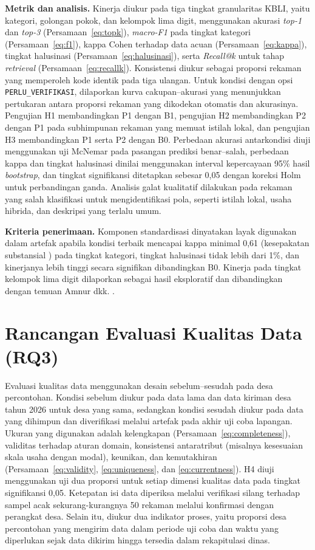 \documentclass[12pt,a4paper]{report}
\begin{document}
\textbf{Metrik dan analisis.} Kinerja diukur pada tiga tingkat granularitas KBLI, yaitu kategori, golongan pokok, dan kelompok lima digit, menggunakan akurasi \textit{top-1} dan \textit{top-3} (Persamaan~\ref{eq:topk}), \textit{macro-F1} pada tingkat kategori (Persamaan~\ref{eq:f1}), kappa Cohen terhadap data acuan (Persamaan~\ref{eq:kappa}), tingkat halusinasi (Persamaan~\ref{eq:halusinasi}), serta \textit{Recall@k} untuk tahap \textit{retrieval} (Persamaan~\ref{eq:recallk}). Konsistensi diukur sebagai proporsi rekaman yang memperoleh kode identik pada tiga ulangan. Untuk kondisi dengan opsi \texttt{PERLU\_VERIFIKASI}, dilaporkan kurva cakupan--akurasi yang menunjukkan pertukaran antara proporsi rekaman yang dikodekan otomatis dan akurasinya. Pengujian H1 membandingkan P1 dengan B1, pengujian H2 membandingkan P2 dengan P1 pada subhimpunan rekaman yang memuat istilah lokal, dan pengujian H3 membandingkan P1 serta P2 dengan B0. Perbedaan akurasi antarkondisi diuji menggunakan uji McNemar pada pasangan prediksi benar--salah, perbedaan kappa dan tingkat halusinasi dinilai menggunakan interval kepercayaan 95\% hasil \textit{bootstrap}, dan tingkat signifikansi ditetapkan sebesar 0,05 dengan koreksi Holm untuk perbandingan ganda. Analisis galat kualitatif dilakukan pada rekaman yang salah klasifikasi untuk mengidentifikasi pola, seperti istilah lokal, usaha hibrida, dan deskripsi yang terlalu umum.

\textbf{Kriteria penerimaan.} Komponen standardisasi dinyatakan layak digunakan dalam artefak apabila kondisi terbaik mencapai kappa minimal 0,61 (kesepakatan substansial \cite{landis1977kappa}) pada tingkat kategori, tingkat halusinasi tidak lebih dari 1\%, dan kinerjanya lebih tinggi secara signifikan dibandingkan B0. Kinerja pada tingkat kelompok lima digit dilaporkan sebagai hasil eksploratif dan dibandingkan dengan temuan Amnur dkk. \cite{amnur2025kbli}.

\section{Rancangan Evaluasi Kualitas Data (RQ3)}
\label{sec:evalkualitas}

Evaluasi kualitas data menggunakan desain sebelum--sesudah pada desa percontohan. Kondisi sebelum diukur pada data lama dan data kiriman desa tahun 2026 untuk desa yang sama, sedangkan kondisi sesudah diukur pada data yang dihimpun dan diverifikasi melalui artefak pada akhir uji coba lapangan. Ukuran yang digunakan adalah kelengkapan (Persamaan~\ref{eq:completeness}), validitas terhadap aturan domain, konsistensi antaratribut (misalnya kesesuaian skala usaha dengan modal), keunikan, dan kemutakhiran (Persamaan~\eqref{eq:validity}, \eqref{eq:uniqueness}, dan \eqref{eq:currentness}). H4 diuji menggunakan uji dua proporsi untuk setiap dimensi kualitas data pada tingkat signifikansi 0,05. Ketepatan isi data diperiksa melalui verifikasi silang terhadap sampel acak sekurang-kurangnya 50 rekaman melalui konfirmasi dengan perangkat desa. Selain itu, diukur dua indikator proses, yaitu proporsi desa percontohan yang mengirim data dalam periode uji coba dan waktu yang diperlukan sejak data dikirim hingga tersedia dalam rekapitulasi dinas.
\end{document}
